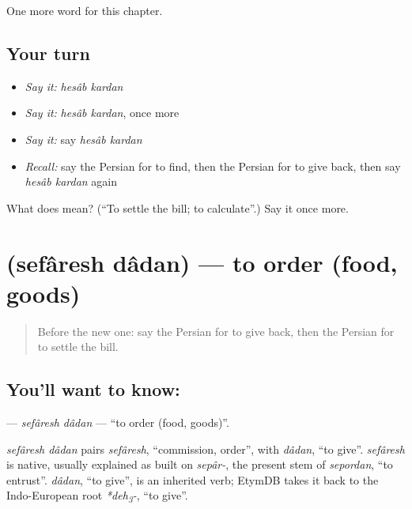 \begin{grammarlens}[title={What you've built}]
One more word for this chapter.
\end{grammarlens}

\subsection*{Your turn}
\begin{itemize}
\raggedright
  \item \emph{Say it:} \emph{hesâb kardan}
  \item \emph{Say it:} \emph{hesâb kardan}, once more
  \item \emph{Say it:} say \emph{hesâb kardan}
  \item \emph{Recall:} say the Persian for to find, then the Persian for to give back, then say \emph{hesâb kardan} again
\end{itemize}

\begin{tcolorbox}[breakable,colback=teal!4,colframe=teal!35!black,title={Before you move on}]
What does   mean? (\textquotedblleft{}To settle the bill; to calculate\textquotedblright{}.) Say it once more.
\end{tcolorbox}
\section[\texorpdfstring{\fa{سفارش} \fa{دادن} (sefâresh dâdan)}{سفارش دادن (sefâresh dâdan)}]{  (sefâresh dâdan) — to order (food, goods)}

\label{lesson:FA-C141-sefaresh-dadan}



\begin{quote}
Before the new one: say the Persian for to give back, then the Persian for to settle the bill.
\end{quote}

\subsection*{You'll want to know:  }
\textbf{ } — \emph{sefâresh dâdan} — \textquotedblleft{}to order (food, goods)\textquotedblright{}.

\begin{cousinweb}
\emph{sefâresh dâdan} pairs \emph{sefâresh}, \textquotedblleft{}commission, order\textquotedblright{}, with \emph{dâdan}, \textquotedblleft{}to give\textquotedblright{}. \emph{sefâresh} is native, usually explained as built on \emph{sepâr-}, the present stem of \emph{sepordan}, \textquotedblleft{}to entrust\textquotedblright{}. \emph{dâdan}, \textquotedblleft{}to give\textquotedblright{}, is an inherited verb; EtymDB takes it back to the Indo-European root \emph{*deh\textsubscript{3}-}, \textquotedblleft{}to give\textquotedblright{}.
\end{cousinweb}

